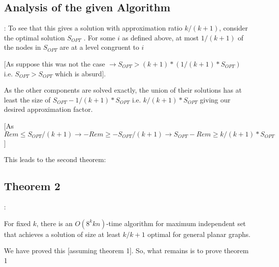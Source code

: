 \documentclass{beamer}
\begin{document}
\subsection{Analysis of the given Algorithm}
\begin{frame}{\secname : \subsecname}
    To see that this gives a solution with approximation ratio
$k/(k + 1)$, consider the optimal solution $S_{OPT}$ . For some $i$
as defined above, at most $1/(k + 1)$ of the nodes in $S_{OPT}$
are at a level congruent to $i$ 

[As suppose this was not the case $\rightarrow S_{OPT} > (k + 1) * (1/(k + 1) * S_{OPT})$ i.e. $S_{OPT} > S_{OPT}$ which is absurd]. 

As the other components
are solved exactly, the union of their solutions has at least
the size of $S_{OPT} - 1/(k + 1) * S_{OPT}$ i.e. $k/(k + 1) * S_{OPT}$ giving our desired approximation factor. 

[As $Rem \leq S_{OPT}/(k + 1) \rightarrow -Rem \geq -S_{OPT}/(k + 1) \rightarrow S_{OPT} - Rem \geq k/(k+1)*S_{OPT}$]

This leads to the second theorem:
\end{frame}
\subsection{Theorem 2}
\begin{frame}{\secname : \subsecname}
    \begin{theorem}
        [Baker, 1994] For fixed $k$, there is an
$O(8^kkn)$-time algorithm for maximum independent set
that achieves a solution of size at least $k/k+1$ optimal for
general planar graphs. 
    \end{theorem}

    We have proved this [assuming theorem 1]. So, what remains is to prove theorem 1
\end{frame}
\end{document}

